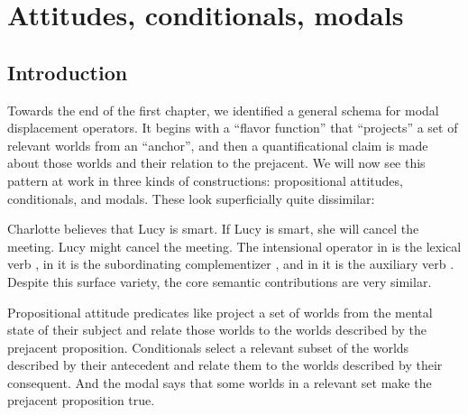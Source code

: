 \chapter{Attitudes, conditionals, modals}
\label{cha:att-cond-mod}

\minitoc

\section*{Introduction}

Towards the end of the first chapter, we identified a general schema for modal
displacement operators. It begins with a ``flavor function'' that ``projects'' a
set of relevant worlds from an ``anchor'', and then a quantificational claim is
made about those worlds and their relation to the prejacent. We will now see
this pattern at work in three kinds of constructions: propositional attitudes,
conditionals, and modals. These look superficially quite dissimilar:

\pex
\a Charlotte believes that Lucy is smart.
\a If Lucy is smart, she will cancel the meeting.
\a Lucy might cancel the meeting.
\xe
%
The intensional operator in \Last[a] is the lexical verb ,
in \Last[b] it is the subordinating complementizer , and in
\Last[c] it is the auxiliary verb . Despite this surface
variety, the core semantic contributions are very similar.

Propositional attitude predicates like  project a set of
worlds from the mental state of their subject and relate those worlds to the
worlds described by the prejacent proposition. Conditionals select a relevant
subset of the worlds described by their antecedent and relate them to the worlds
described by their consequent. And the modal  says that
some worlds in a relevant set make the prejacent proposition true.

